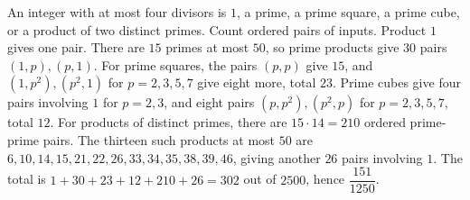 An integer with at most four divisors is $1$, a prime, a prime square, a prime cube, or a product of two distinct primes. Count ordered pairs of inputs. Product $1$ gives one pair. There are $15$ primes at most $50$, so prime products give $30$ pairs $(1,p),(p,1)$. For prime squares, the pairs $(p,p)$ give $15$, and $(1,p^2),(p^2,1)$ for $p=2,3,5,7$ give eight more, total $23$. Prime cubes give four pairs involving $1$ for $p=2,3$, and eight pairs $(p,p^2),(p^2,p)$ for $p=2,3,5,7$, total $12$. For products of distinct primes, there are $15\cdot14=210$ ordered prime-prime pairs. The thirteen such products at most $50$ are $6,10,14,15,21,22,26,33,34,35,38,39,46$, giving another $26$ pairs involving $1$. The total is $1+30+23+12+210+26=302$ out of $2500$, hence $\boxed{\dfrac{151}{1250}}$.
